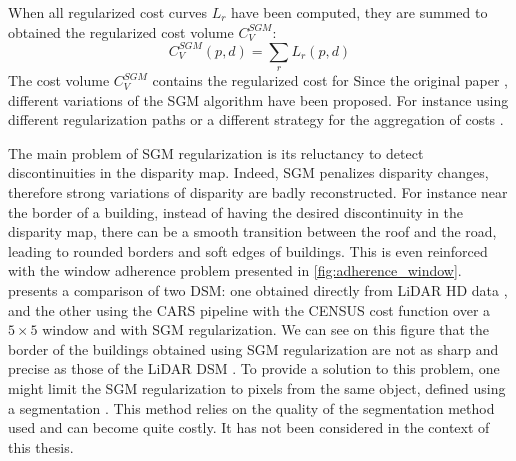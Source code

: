 When all regularized cost curves $L_r$ have been computed, they are summed to obtained the regularized cost volume $C_V^{SGM}$:
\begin{equation}
    C_V^{SGM}(p, d) = \sum_r L_r(p,d)
\end{equation}
The cost volume $C^{SGM}_V$ contains the regularized cost for 
Since the original paper \cite{hirschmuller_accurate_2005}, different variations of the SGM algorithm have been proposed. For instance using different regularization paths \cite{facciolo_mgm_2015} or a different strategy for the aggregation of costs \cite{poggi_learning_2016}.

The main problem of SGM regularization is its reluctancy to detect discontinuities in the disparity map. Indeed, SGM penalizes disparity changes, therefore strong variations of disparity are badly reconstructed. For instance near the border of a building, instead of having the desired discontinuity in the disparity map, there can be a smooth transition  between the roof and the road, leading to rounded borders and soft edges of buildings. This is even reinforced with the window adherence problem presented in \ref{fig:adherence_window}.  presents a comparison of two DSM: one obtained directly from LiDAR HD data \cite{monnet_lidarhd_2023}, and the other using the CARS pipeline with the CENSUS cost function over a $5\times5$ window and with SGM regularization. We can see on this figure that the border of the buildings obtained using SGM regularization are not as sharp and precise as those of the LiDAR DSM . To provide a solution to this problem, one might limit the SGM regularization to pixels from the same object, defined using a segmentation \cite{dumas_improving_2022}. This method relies on the quality of the segmentation method used and can become quite costly. It has not been considered in the context of this thesis. 

